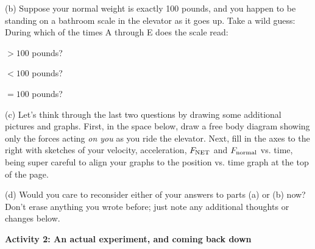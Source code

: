 (b) Suppose your normal weight is exactly 100 pounds, and you happen to be standing on a bathroom scale in the elevator as it goes up.  Take a wild guess: During which of the times A through E does the scale read:

\hspace{0.5in} $> 100$ pounds?

\hspace{0.5in} $< 100$ pounds?

\hspace{0.5in} $= 100$ pounds?

\begin{wrapfigure}[8]{r}{0.5\textwidth}
\end{wrapfigure}

\bigskip
(c) Let's think through the last two questions by drawing some additional pictures and graphs.  First, in the space below, draw a free body diagram showing only the forces acting \textit{on you} as you ride the elevator.  Next, fill in the axes to the right with sketches of your velocity, acceleration, $F_{\rm NET}$ and $F_{\rm normal}$ vs. time, being super careful to align your graphs to the position vs. time graph at the top of the page.
\answerspace{1in}

\newpage
(d) Would you care to reconsider either of your answers to parts (a) or (b) now?  Don't erase anything you wrote before; just note any additional thoughts or changes below.
\answerspace{0.8in}


\textbf{Activity 2: An actual experiment, and coming back down}

